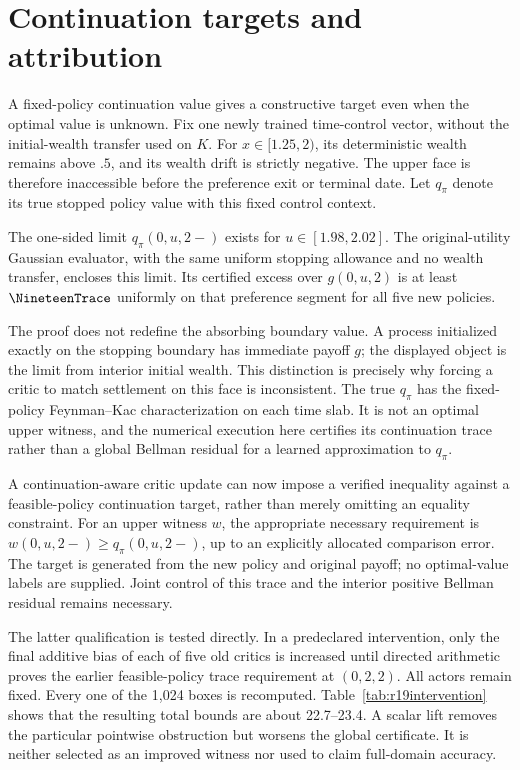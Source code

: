 \section{Continuation targets and attribution}\label{sec:r19trace}
A fixed-policy continuation value gives a constructive target even when the optimal value is unknown. Fix one newly trained time-control vector, without the initial-wealth transfer used on $K$. For $x\in[1.25,2)$, its deterministic wealth remains above $.5$, and its wealth drift is strictly negative. The upper face is therefore inaccessible before the preference exit or terminal date. Let $q_\pi$ denote its true stopped policy value with this fixed control context.

\begin{proposition}\label{prop:r19trace}
The one-sided limit $q_\pi(0,u,2-)$ exists for $u\in[1.98,2.02]$. The original-utility Gaussian evaluator, with the same uniform stopping allowance and no wealth transfer, encloses this limit. Its certified excess over $g(0,u,2)$ is at least $\NineteenTrace$ uniformly on that preference segment for all five new policies.
\end{proposition}
The proof does not redefine the absorbing boundary value. A process initialized exactly on the stopping boundary has immediate payoff $g$; the displayed object is the limit from interior initial wealth. This distinction is precisely why forcing a critic to match settlement on this face is inconsistent. The true $q_\pi$ has the fixed-policy Feynman--Kac characterization on each time slab. It is not an optimal upper witness, and the numerical execution here certifies its continuation trace rather than a global Bellman residual for a learned approximation to $q_\pi$.

A continuation-aware critic update can now impose a verified inequality against a feasible-policy continuation target, rather than merely omitting an equality constraint. For an upper witness $w$, the appropriate necessary requirement is $w(0,u,2-)\geq q_\pi(0,u,2-)$, up to an explicitly allocated comparison error. The target is generated from the new policy and original payoff; no optimal-value labels are supplied. Joint control of this trace and the interior positive Bellman residual remains necessary.

The latter qualification is tested directly. In a predeclared intervention, only the final additive bias of each of five old critics is increased until directed arithmetic proves the earlier feasible-policy trace requirement at $(0,2,2)$. All actors remain fixed. Every one of the 1,024 boxes is recomputed. Table~\ref{tab:r19intervention} shows that the resulting total bounds are about 22.7--23.4. A scalar lift removes the particular pointwise obstruction but worsens the global certificate. It is neither selected as an improved witness nor used to claim full-domain accuracy.


